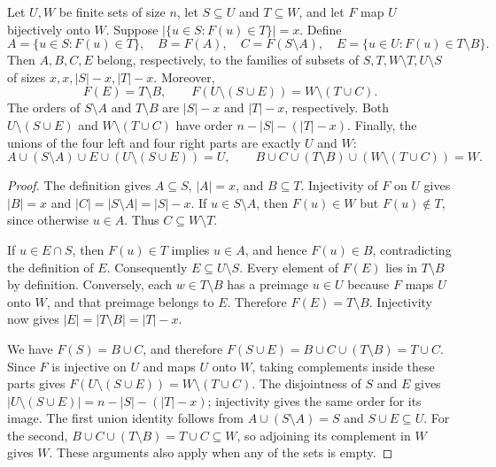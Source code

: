 \begin{lemma}
Let $U,W$ be finite sets of size $n$, let $S\subseteq U$ and
$T\subseteq W$, and let $F$ map $U$ bijectively onto $W$.
Suppose $|\{u\in S:F(u)\in T\}|=x$. Define
\[
 A=\{u\in S:F(u)\in T\},\quad B=F(A),\quad
 C=F(S\setminus A),\quad E=\{u\in U:F(u)\in T\setminus B\}.
\]
Then $A,B,C,E$ belong, respectively, to the families of subsets of
$S,T,W\setminus T,U\setminus S$ of sizes $x,x,|S|-x,|T|-x$.
Moreover,
\[
 F(E)=T\setminus B,\qquad
 F(U\setminus(S\cup E))=W\setminus(T\cup C).
\]
The orders of $S\setminus A$ and $T\setminus B$ are $|S|-x$ and
$|T|-x$, respectively. Both $U\setminus(S\cup E)$ and
$W\setminus(T\cup C)$ have order $n-|S|-(|T|-x)$.
Finally, the unions of the four left and four right parts are exactly
$U$ and $W$:
\[
 A\cup(S\setminus A)\cup E\cup(U\setminus(S\cup E))=U,
 \qquad
 B\cup C\cup(T\setminus B)\cup(W\setminus(T\cup C))=W.
\]
\end{lemma}
\begin{proof}
The definition gives $A\subseteq S$, $|A|=x$, and $B\subseteq T$.
Injectivity of $F$ on $U$ gives $|B|=x$ and
$|C|=|S\setminus A|=|S|-x$. If $u\in S\setminus A$, then
$F(u)\in W$ but $F(u)\notin T$, since otherwise $u\in A$.
Thus $C\subseteq W\setminus T$.

If $u\in E\cap S$, then $F(u)\in T$ implies $u\in A$, and
hence $F(u)\in B$, contradicting the definition of $E$.
Consequently $E\subseteq U\setminus S$. Every element of $F(E)$
lies in $T\setminus B$ by definition. Conversely, each
$w\in T\setminus B$ has a preimage $u\in U$ because $F$ maps $U$
onto $W$, and that preimage belongs to $E$. Therefore
$F(E)=T\setminus B$. Injectivity now gives
$|E|=|T\setminus B|=|T|-x$.

We have $F(S)=B\cup C$, and therefore
$F(S\cup E)=B\cup C\cup(T\setminus B)=T\cup C$.
Since $F$ is injective on $U$ and maps $U$ onto $W$, taking complements
inside these parts gives
$F(U\setminus(S\cup E))=W\setminus(T\cup C)$.
The disjointness of $S$ and $E$ gives
$|U\setminus(S\cup E)|=n-|S|-(|T|-x)$; injectivity gives the
same order for its image. The first union identity follows from
$A\cup(S\setminus A)=S$ and $S\cup E\subseteq U$.
For the second, $B\cup C\cup(T\setminus B)=T\cup C\subseteq W$,
so adjoining its complement in $W$ gives $W$. These arguments also
apply when any of the sets is empty.
\end{proof}
